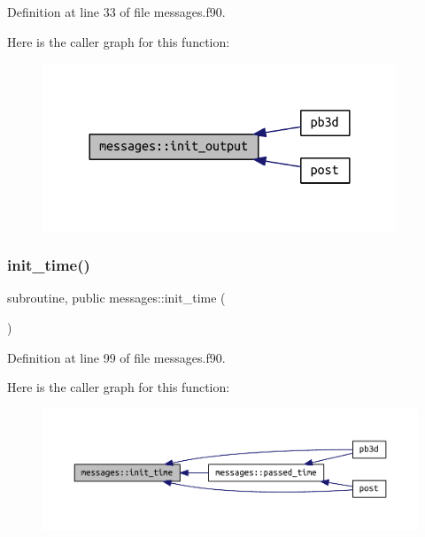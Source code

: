 Definition at line 33 of file messages.\+f90.

Here is the caller graph for this function\+:
\nopagebreak
\begin{figure}[H]
\begin{center}
\leavevmode
\includegraphics[width=300pt]{namespacemessages_aff8b6368cf0f8895b0f6c357df98cc21_icgraph}
\end{center}
\end{figure}
\mbox{\label{namespacemessages_a16a1008834c161135f444d8e8e6d78d7}} 
\subsubsection{\texorpdfstring{init\+\_\+time()}{init\_time()}}
{\footnotesize\ttfamily subroutine, public messages\+::init\+\_\+time (\begin{DoxyParamCaption}{ }\end{DoxyParamCaption})}



Definition at line 99 of file messages.\+f90.

Here is the caller graph for this function\+:
\nopagebreak
\begin{figure}[H]
\begin{center}
\leavevmode
\includegraphics[width=350pt]{namespacemessages_a16a1008834c161135f444d8e8e6d78d7_icgraph}
\end{center}
\end{figure}
\mbox{\label{namespacemessages_a6e6bfb084063e4cc91ee86e542043302}} 
